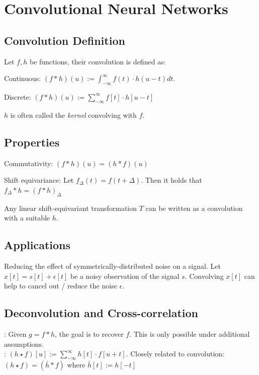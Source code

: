 \section{Convolutional Neural Networks}
\subsection*{Convolution Definition}Let $f,h$ be functions, their convolution is defined as:\\
\begin{inparaitem}[$\color{mygreen} \triangleright$]
\item Continuous: $(f * h)(u) := \int_{-\infty}^{\infty}f(t)\cdot h(u-t)dt$.\\
\item Discrete: $(f * h)(u) := \sum_{-\infty}^{\infty}f[t] \cdot h[u-t]$\\
\end{inparaitem}
 $h$ is often called the \textit{kernel} convolving with $f$.
\subsection*{Properties}
\begin{inparaitem}[$\color{mygreen} \triangleright$]
\item Commutativity: $(f * h)(u) = (h * f)(u)$\\
\item Shift equivariance: Let $f_{\Delta}(t) = f(t + \Delta)$. Then it holds that $f_{\Delta} * h = (f * h)_{\Delta}$\\
\item Any linear shift-equivariant transformation $T$ can be written as a convolution with a suitable $h$.
\end{inparaitem}
\subsection*{Applications}
\begin{inparaitem}[$\color{mygreen} \triangleright$]
\item Reducing the effect of symmetrically-distributed noise on a signal. Let $x[t] = s[t] + \epsilon[t]$ be a noisy observation of the signal $s$. Convolving $x[t]$ can help to cancel out / reduce the noise $\epsilon$.
\end{inparaitem}
\subsection*{Deconvolution and Cross-correlation}
: Given $g = f * h$, the goal is to recover $f$. This is only possible under additional assumptions.\\
: $(h \star f)[u] := \sum_{-\infty}^{\infty}h[t]\cdot f[u+t]$. Closely related to convolution: $(h \star f) = (\bar{h} * f)$ where $\bar{h}[t] := h[-t]$

